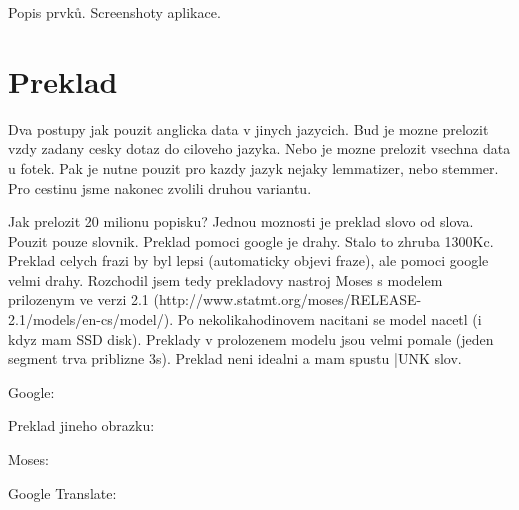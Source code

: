 Popis prvků. Screenshoty aplikace.

\section{Preklad}

Dva postupy jak pouzit anglicka data v jinych jazycich. Bud je mozne prelozit vzdy zadany cesky dotaz do ciloveho jazyka. Nebo je mozne prelozit vsechna data u fotek. Pak je nutne pouzit pro kazdy jazyk nejaky lemmatizer, nebo stemmer. Pro cestinu jsme nakonec zvolili druhou variantu.

Jak prelozit 20 milionu popisku? Jednou moznosti je preklad slovo od slova. Pouzit pouze slovnik. Preklad pomoci google je drahy. Stalo to zhruba 1300Kc. Preklad celych frazi by byl lepsi (automaticky objevi fraze), ale pomoci google velmi drahy. Rozchodil jsem tedy prekladovy nastroj Moses s modelem prilozenym ve verzi 2.1 (http://www.statmt.org/moses/RELEASE-2.1/models/en-cs/model/). Po nekolikahodinovem nacitani se model nacetl (i kdyz mam SSD disk). Preklady v prolozenem modelu jsou velmi pomale (jeden segment trva priblizne 3s). Preklad neni idealni a mam spustu |UNK slov.

Google:

Preklad jineho obrazku:

Moses:

Google Translate:


